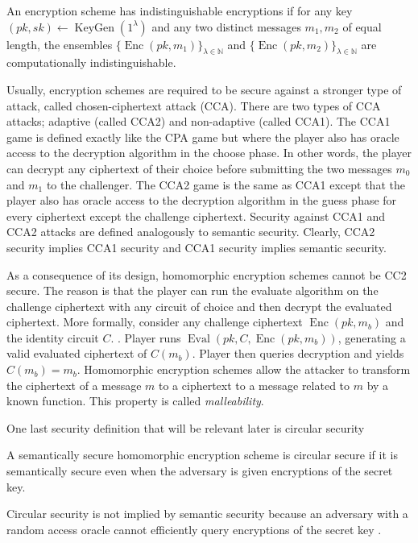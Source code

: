 \begin{definition}
    An encryption scheme has indistinguishable encryptions if for any key $(pk,sk) \leftarrow \operatorname{KeyGen}(1^{\lambda})$ and any two distinct messages $m_1, m_2$ of equal length, the ensembles $\{\operatorname{Enc}(pk,m_1)\}_{\lambda \in \mathbb{N}}$ and $\{\operatorname{Enc}(pk,m_2)\}_{\lambda \in \mathbb{N}}$ are computationally indistinguishable.
\end{definition}

Usually, encryption schemes are required to be secure against a stronger type of attack, called chosen-ciphertext attack (CCA). There are two types of CCA attacks; adaptive (called CCA2) and non-adaptive (called CCA1). The CCA1 game is defined exactly like the CPA game but where the player also has oracle access to the decryption algorithm in the choose phase. In other words, the player can decrypt any ciphertext of their choice before submitting the two messages $m_0$ and $m_1$ to the challenger. The CCA2 game is the same as CCA1 except that the player also has oracle access to the decryption algorithm in the guess phase for every ciphertext except the challenge ciphertext. Security against CCA1 and CCA2 attacks are defined analogously to semantic security. Clearly, CCA2 security implies CCA1 security and CCA1 security implies semantic security.

As a consequence of its design, homomorphic encryption schemes cannot be CC2 secure. The reason is that the player can run the evaluate algorithm on the challenge ciphertext with any circuit of choice and then decrypt the evaluated ciphertext. More formally, consider any challenge ciphertext $\operatorname{Enc}(pk,m_b)$ and the identity circuit $C$. . Player runs $\operatorname{Eval}(pk,C,\operatorname{Enc}(pk,m_b))$, generating a valid evaluated ciphertext of $C(m_b)$. Player then queries decryption and yields $C(m_b) = m_b$. Homomorphic encryption schemes allow the attacker to transform the ciphertext of a message $m$ to a ciphertext to a message related to $m$ by a known function. This property is called \emph{malleability}.


One last security definition that will be relevant later is circular security
\begin{definition}
    A semantically secure homomorphic encryption scheme is circular secure if it is semantically secure even when the adversary is given encryptions of the secret key.
\end{definition}
\begin{remark}
    Circular security is not implied by semantic security because an adversary with a random access oracle cannot efficiently query encryptions of the secret key \cite{Bra18-survey}.
\end{remark}

